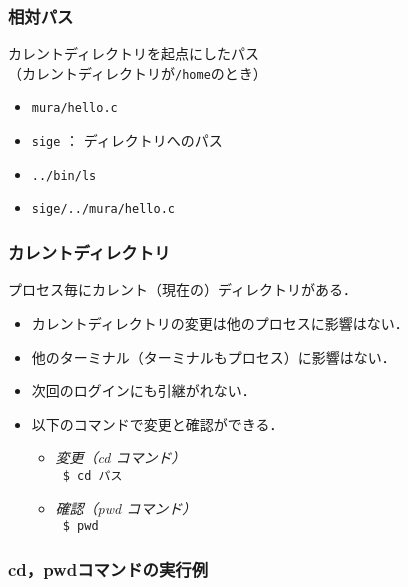 \documentclass{beamer}                 %
\begin{document}
\begin{frame}[fragile]
  \frametitle{相対パス}

  カレントディレクトリを起点にしたパス\\
  （カレントディレクトリが\texttt{/home}のとき）
  \begin{itemize}
  \item \texttt{mura/hello.c}
  \item \texttt{sige} ： ディレクトリへのパス
  \item \texttt{../bin/ls}
  \item \texttt{sige/../mura/hello.c}
  \end{itemize}
\end{frame}

\begin{frame}[fragile]
  \frametitle{カレントディレクトリ}

  プロセス毎にカレント（現在の）ディレクトリがある．
  \begin{itemize}
  \item カレントディレクトリの変更は他のプロセスに影響はない．
  \item 他のターミナル（ターミナルもプロセス）に影響はない．
  \item 次回のログインにも引継がれない．
  \item 以下のコマンドで変更と確認ができる．
    \begin{itemize}
      \item \emph{変更（cd コマンド）} \\
        \texttt{ \$ cd パス }
      \item \emph{確認（pwd コマンド）} \\
        \texttt{ \$ pwd }
    \end{itemize}
  \end{itemize}
\end{frame}

\begin{frame}[fragile]
  \frametitle{cd，pwdコマンドの実行例}

  \begin{minipage}{0.4\columnwidth}
  \end{minipage}
  \begin{minipage}{0.55\columnwidth}
  \end{minipage}
\end{frame}
\end{document}
